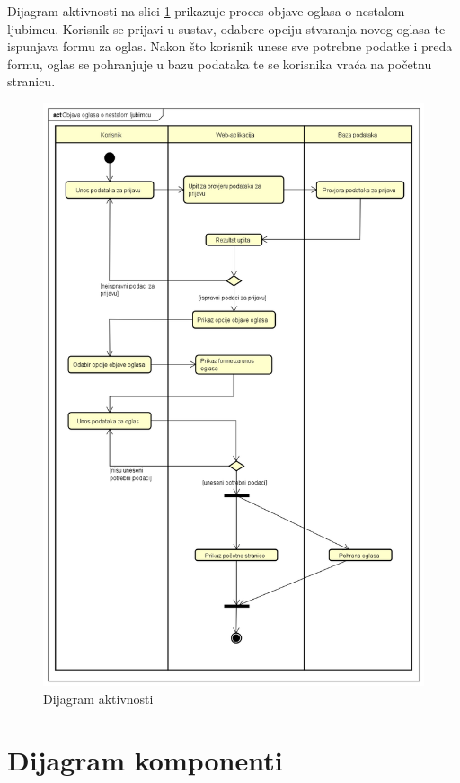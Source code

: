 			Dijagram aktivnosti na slici \ref{dijagram_aktivnosti} prikazuje proces objave oglasa o nestalom ljubimcu. Korisnik se prijavi u sustav, odabere opciju stvaranja novog oglasa te ispunjava formu za oglas. Nakon što korisnik unese sve potrebne podatke i preda formu, oglas se pohranjuje u bazu podataka te se korisnika vraća na početnu stranicu.
			 
			 \begin{figure}[H]
				\includegraphics[scale=0.5]{slike/dijagram_aktivnosti.PNG} 
				\centering
				\caption{Dijagram aktivnosti}
				\label{dijagram_aktivnosti}
			\end{figure}
			
			\eject
		
		\section{Dijagram komponenti}
		
